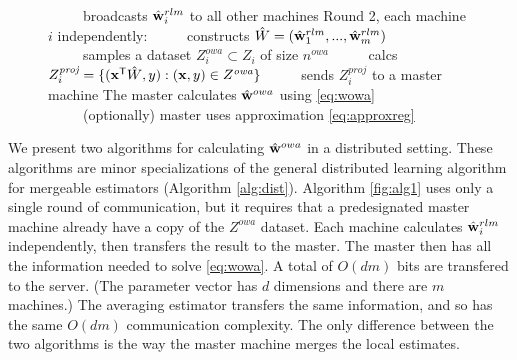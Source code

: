 \documentclass[thesis.tex]{subfiles}
\newcommand{\Zproj}{Z^{\textit{proj}}}
\newcommand{\Zowa}{Z^{\textit{owa}}}
\newcommand{\nowa}{n^{\textit{owa}}}
\begin{document}
\begin{figure}[t]
\begin{algorithm}[H]
\begin{algorithmic}
    \State \hspace{-0.1in}~~~~~broadcasts $\hat{\mathbf w}^{rlm}_i$ to all other machines
    \State \hspace{-0.1in}Round 2, each machine $i$ independently:
    \State \hspace{-0.1in}~~~~~constructs $\hat W=(\hat{\mathbf w}^{rlm}_1,...,\hat{\mathbf w}^{rlm}_m)$
    \State \hspace{-0.1in}~~~~~samples a dataset $\Zowa_i\subset Z_i$ of size $\nowa$
    \State \hspace{-0.1in}~~~~~calcs $\Zproj_i=\{(\trans\x\matW,y) : (\x,y)\in\Zowa\}$
    \State \hspace{-0.1in}~~~~~sends $\Zproj_i$ to a master machine
    \State \hspace{-0.1in}The master calculates $\hat{\mathbf w}^{owa}$ using \eqref{eq:wowa} %
    \State \hspace{-0.1in}~~~~~(optionally) master uses approximation \eqref{eq:approxreg}
\end{algorithmic}
\label{fig:alg2}
\end{algorithm}
\end{figure}

We present two algorithms for calculating $\hat{\mathbf w}^{owa}$ in a distributed setting.
These algorithms are minor specializations of the general distributed learning algorithm for mergeable estimators (Algorithm \ref{alg:dist}).
Algorithm \ref{fig:alg1} uses only a single round of communication, 
but it requires that a predesignated master machine already have a copy of the $\Zowa$ dataset.
Each machine calculates $\hat{\mathbf w}^{rlm}_i$ independently,
then transfers the result to the master.
The master then has all the information needed to solve \eqref{eq:wowa}. 
A total of $O(dm)$ bits are transfered to the server.
(The parameter vector has $d$ dimensions and there are $m$ machines.)
The averaging estimator transfers the same information,
and so has the same $O(dm)$ communication complexity.
The only difference between the two algorithms is the way the master machine merges the local estimates.
\end{document}
